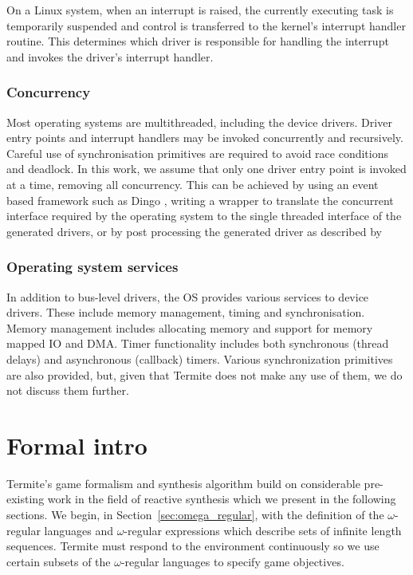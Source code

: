 On a Linux system, when an interrupt is raised, the currently executing task is temporarily suspended and control is transferred to the kernel's interrupt handler routine. This determines which driver is responsible for handling the interrupt and invokes the driver's interrupt handler.

\subsubsection{Concurrency}

Most operating systems are multithreaded, including the device drivers. Driver entry points and interrupt handlers may be invoked concurrently and recursively. Careful use of synchronisation primitives are required to avoid race conditions and deadlock. In this work, we assume that only one driver entry point is invoked at a time, removing all concurrency. This can be achieved by using an event based framework such as Dingo \cite{Ryzhyk_CKH_09}, writing a wrapper to translate the concurrent interface required by the operating system to the single threaded interface of the generated drivers, or by post processing the generated driver as described by \cite{Cerny_HRRT_13}

\subsubsection{Operating system services}

In addition to bus-level drivers, the OS provides various services to device drivers. These include memory management, timing and synchronisation. Memory management includes allocating memory and support for memory mapped IO and DMA. Timer functionality includes both synchronous (thread delays) and asynchronous (callback) timers. Various synchronization primitives are also provided, but, given that Termite does not make any use of them, we do not discuss them further.

\section{Formal intro}

Termite's game formalism and synthesis algorithm build on considerable pre-existing work in the field of reactive synthesis which we present in the following sections. We begin, in Section~\ref{sec:omega_regular}, with the definition of the $\omega$-regular languages and $\omega$-regular expressions which describe sets of infinite length sequences. Termite must respond to the environment continuously so we use certain subsets of the $\omega$-regular languages to specify game objectives.

